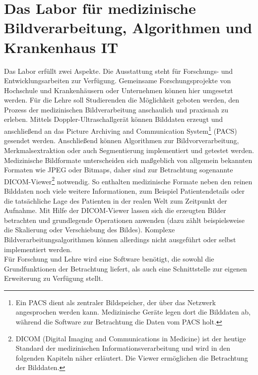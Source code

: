 \section{Das Labor für medizinische Bildverarbeitung, Algorithmen und Krankenhaus IT}\label{einleitung:labor}
Das Labor erfüllt zwei Aspekte. Die Ausstattung steht für Forschungs- und Entwicklungsarbeiten zur Verfügung. Gemeinsame Forschungsprojekte von Hochschule und Krankenhäusern oder Unternehmen können hier umgesetzt werden.
Für die Lehre soll Studierenden die Möglichkeit geboten werden, den Prozess der medizinischen Bildverarbeitung anschaulich und praxisnah zu erleben. Mittels Doppler-Ultraschallgerät können Bilddaten erzeugt und anschließend an das Picture Archiving and Communication System\footnote{Ein PACS dient als zentraler Bildspeicher, der über das Netzwerk angesprochen werden kann. Medizinische Geräte legen dort die Bilddaten ab, während die Software zur Betrachtung die Daten vom PACS holt.} (PACS) gesendet werden. Anschließend können Algorithmen zur Bildvorverarbeitung, Merkmalsextraktion oder auch Segmentierung implementiert und getestet werden.\\
Medizinische Bildformate unterscheiden sich maßgeblich von allgemein bekannten Formaten wie JPEG oder Bitmaps, daher sind zur Betrachtung sogenannte DICOM-Viewer\footnote{DICOM (Digital Imaging and Communications in Medicine) ist der heutige Standard der medizinischen Informationsverarbeitung und wird in den folgenden Kapiteln näher erläutert. Die Viewer ermöglichen die Betrachtung der Bilddaten.} notwendig. So enthalten medizinische Formate neben den reinen Bilddaten noch viele weitere Informationen, zum Beispiel Patientendetails oder die tatsächliche Lage des Patienten in der realen Welt zum Zeitpunkt der Aufnahme.
Mit Hilfe der DICOM-Viewer lassen sich die erzeugten Bilder betrachten und grundlegende Operationen anwenden (dazu zählt beispielsweise die Skalierung oder Verschiebung des Bildes). Komplexe Bildverarbeitungsalgorithmen können allerdings nicht ausgeführt oder selbst implementiert werden.\\
Für Forschung und Lehre wird eine Software benötigt, die sowohl die Grundfunktionen der Betrachtung liefert, als auch eine Schnittstelle zur eigenen Erweiterung zu Verfügung stellt.


